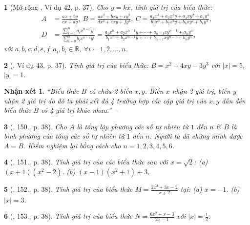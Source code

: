 \documentclass{article}
\newtheorem{baitoan}{}
\newtheorem{nhanxet}{Nhận xét}
\begin{document}
\begin{baitoan}[Mở rộng \cite{Tuyen_Toan_7}, Ví dụ 42, p. 37]
	\label{mo rong Tuyen_Toan_7 vi du 42}
	Cho $y = kx$, tính giá trị của biểu thức:
	\begin{align*}
		A &= \frac{ax + by}{cx + dy},\ B = \frac{ax^2 + bxy + cy^2}{dx^2 + exy + fy^2},\ C = \frac{a_1x^3 + a_2x^2y + a_3xy^2 + a_4y^3}{b_1x^3 + b_2x^2y + b_3xy^2 + b_4y^3},\\
		D &= \frac{\sum_{i=0}^n a_ix^{n-i}y^i}{\sum_{i=0}^n b_ix^{n-i}y^i} = \frac{a_1x^n + a_2x^{n-1}y + \cdots + a_{n-1}xy^{n-1} + a_ny^n}{b_1x^n + b_2x^{n-1}y + \cdots + b_{n-1}xy^{n-1} + b_ny^n},
	\end{align*}
	với $a,b,c,d,e,f,a_i,b_i\in\mathbb{R}$, $\forall i = 1,2,\ldots,n$.
\end{baitoan}

\begin{baitoan}[\cite{Tuyen_Toan_7}, Ví dụ 43, p. 37]
	Tính giá trị của biểu thức: $B = x^2 + 4xy - 3y^3$ với $|x| = 5$, $|y| = 1$.
\end{baitoan}

\begin{nhanxet}
	``Biểu thức $B$ có chứa 2 biến $x,y$. Biến $x$ nhận 2 giá trị, biến $y$ nhận 2 giá trị do đó ta phải xét đủ 4 trường hợp các cặp giá trị của $x,y$ dẫn đến biểu thức $B$ có 4 giá trị khác nhau.'' -- \cite[p. 38]{Tuyen_Toan_7}
\end{nhanxet}

\begin{baitoan}[\cite{Tuyen_Toan_7}, 150., p. 38]
	Cho $A$ là tổng lập phương các số tự nhiên từ $1$ đến $n$ \& $B$ là bình phương của tổng các số tự nhiên từ $1$ đến $n$. Người ta đã chứng minh được $A = B$. Kiểm nghiệm lại bằng cách cho $n = 1,2,3,4,5,6$.
\end{baitoan}

\begin{baitoan}[\cite{Tuyen_Toan_7}, 151., p. 38]
	Tính giá trị của các biểu thức sau với $x = \sqrt{2}$: (a) $(x + 1)(x^2 - 2)$. (b) $(x - 1)(x^2 + 1) + 3$.
\end{baitoan}

\begin{baitoan}[\cite{Tuyen_Toan_7}, 152., p. 38]
	Tính giá trị của biểu thức $M = \frac{2x^2 + 3x - 2}{x + 2}$ tại: (a) $x = -1$. (b) $|x| = 3$.
\end{baitoan}

\begin{baitoan}[\cite{Tuyen_Toan_7}, 153., p. 38]
	Tính giá trị của biểu thức $N = \frac{6x^2 + x - 3}{2x - 1}$ với $|x| = \frac{1}{2}$.
\end{baitoan}
\end{document}
